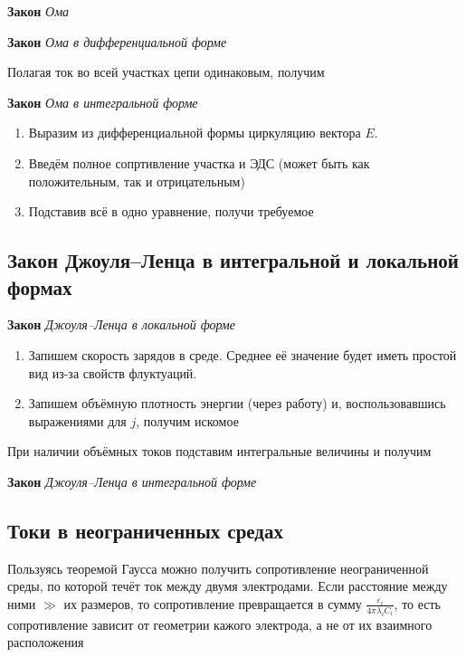 \documentclass[a4paper, 14pt]{article}
\begin{document}
    \textbf{Закон} \textit{Ома}
    
    \textbf{Закон} \textit{Ома в дифференциальной форме}
    
    Полагая ток во всей участках цепи одинаковым, получим
    
    \textbf{Закон} \textit{Ома в интегральной форме}
    
    \begin{enumerate}
        \item Выразим из дифференциальной формы циркуляцию вектора $E$.
        \item Введём полное сопртивление участка и ЭДС (может быть как положительным, так и отрицательным)
        \item Подставив всё в одно уравнение, получи требуемое
    \end{enumerate}
    
    \subsection{Закон Джоуля–Ленца в интегральной и локальной формах}
    
    \textbf{Закон} \textit{Джоуля–Ленца в локальной форме}
    
    \begin{enumerate}
        \item Запишем скорость зарядов в среде.
        Среднее её значение будет иметь простой вид из-за свойств флуктуаций.
        \item Запишем объёмную плотность энергии (через работу) и, воспользовавшись выражениями для $j$, получим искомое
    \end{enumerate}
    
    При наличии объёмных токов подставим интегральные величины и получим
    
    \textbf{Закон} \textit{Джоуля–Ленца в интегральной форме}
    
    \subsection{Токи в неограниченных средах}
    
    Пользуясь теоремой Гаусса можно получить сопротивление неограниченной среды, по которой течёт ток между двумя
    электродами.
    Если расстояние между ними $\gg$ их размеров, то сопротивление превращается в сумму $\frac{\varepsilon_i}{4
    \pi \lambda_i C_i}$, то есть сопротивление зависит от геометрии кажого электрода, а не от их взаимного расположения
    
\end{document}
